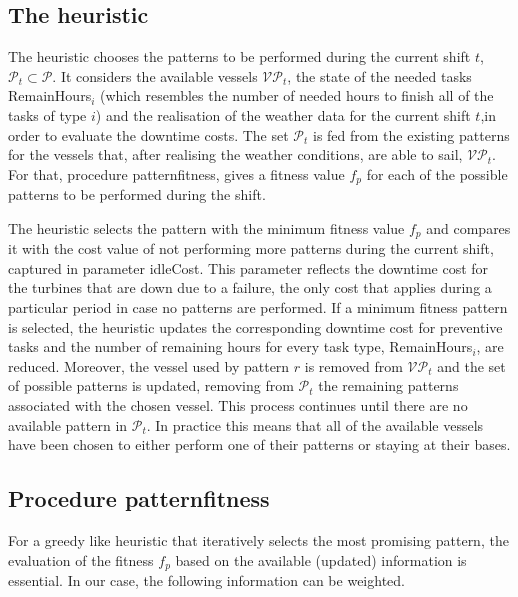 \subsection{The heuristic}
\label{subsec:heuristic}
The heuristic chooses the patterns to be performed during the current shift $t$, $\mathcal{P}_t\subset \mathcal{P}$. It considers the available vessels $\mathcal{VP}_t$, the state of the needed tasks RemainHours$_i$ (which resembles the number of needed hours to finish all of the tasks of type $i$) and the realisation of the weather data for the current shift $t$,in order to evaluate the downtime costs. The set $\mathcal{P}_t$ is fed from the existing patterns for the vessels that, after realising the weather conditions, are able to sail, $\mathcal{VP}_t$. For that, procedure patternfitness, gives a fitness value $f_p$ for each of the possible patterns to be performed during the shift.%

The heuristic selects the pattern with the minimum fitness value $f_p$ and compares it with the cost value of not performing more patterns during the current shift, captured in parameter idleCost. This parameter reflects the downtime cost for the turbines that are down due to a failure, the only cost that applies during a particular period in case no patterns are performed. If a minimum fitness pattern is selected, the heuristic updates the corresponding downtime cost for preventive tasks and the number of remaining hours for every task type, RemainHours$_i$, are reduced. %
Moreover, the vessel used by pattern $r$ is removed from $\mathcal{VP}_t$ and the set of possible patterns is updated, removing from $\mathcal{P}_t$ the remaining patterns associated with the chosen vessel. This process continues until there are no available pattern in $\mathcal{P}_t$. In practice this means that all of the available vessels have been chosen to either perform one of their patterns or staying at their bases.%

\subsection{Procedure patternfitness}
For a greedy like heuristic that iteratively selects the most promising pattern, the evaluation of the fitness $f_p$ based on the available (updated) information is essential. In our case, the following information can be weighted.

